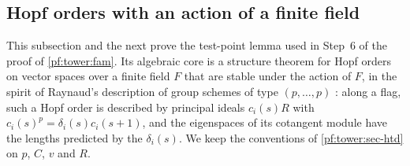 \subsection{Hopf orders with an action of a finite field}\label{pf:tower:sec-hopf}

This subsection and the next prove the test-point lemma used in Step~6 of the proof of \cref{pf:tower:fam}. Its
algebraic core is a structure theorem for Hopf orders on vector spaces over a finite field $F$ that are stable under
the action of $F$, in the spirit of Raynaud's description of group schemes of type $(p,\dots,p)$ \cite{Raynaud1974}:
along a flag, such a Hopf order is described by principal ideals $c_i(s)R$ with $c_i(s)^p=\delta_i(s)c_i(s+1)$, and the
eigenspaces of its cotangent module have the lengths predicted by the $\delta_i(s)$. We keep the conventions of
\cref{pf:tower:sec-htd} on $p$, $C$, $v$ and $R$.

